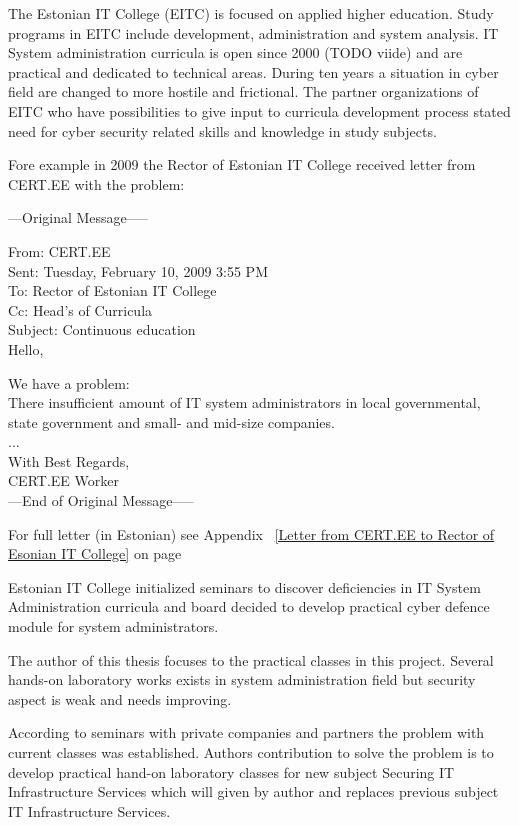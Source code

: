 The Estonian IT College (\gls{EITC}) is focused on applied higher education. Study programs in \gls{EITC} include development, administration and system analysis. IT System administration curricula is open since 2000 {\color{red}(TODO viide)} and are practical and dedicated to technical areas. During ten years a situation in cyber field are changed to more hostile and frictional. The partner organizations of \gls{EITC} who have possibilities to give input to curricula development process stated need for cyber security related skills and knowledge in study subjects.

Fore example in 2009 the Rector of Estonian IT College received letter from \gls{CERT.EE} with the problem:\par
{
\scriptsize
---Original Message-----

From: CERT.EE\\
Sent: Tuesday, February 10, 2009 3:55 PM\\
To: Rector of Estonian IT College\\
Cc: Head's of Curricula \\
Subject: Continuous education\\
Hello,

We have a problem:\\
There insufficient amount of IT system administrators in local  governmental, state government and small- and mid-size companies.\\
...\\
With Best Regards,\\
CERT.EE Worker\\
---End of Original Message-----
}

For full letter (in Estonian) see Appendix ~\ref{Letter from CERT.EE to Rector of Esonian IT College} on page ~\pageref{Letter from CERT.EE to Rector of Esonian IT College}

Estonian IT College initialized seminars to discover deficiencies in IT System Administration curricula and board decided to develop practical cyber defence module for system administrators.

The author of this thesis focuses to the practical classes in this project. Several hands-on laboratory works exists in system administration field but security aspect is weak and needs improving.

According to seminars with private companies and partners the problem with current classes was established. Authors contribution to solve the problem is to develop practical hand-on laboratory classes for new subject Securing IT Infrastructure Services which will given by author and replaces previous subject IT Infrastructure Services. 


